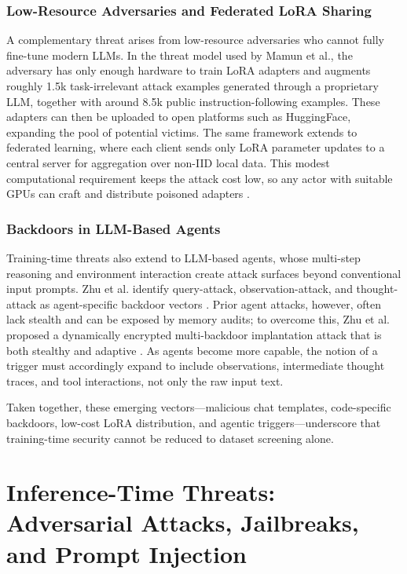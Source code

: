\documentclass[11pt,a4paper]{article}
\begin{document}
\subsubsection{Low-Resource Adversaries and Federated LoRA Sharing}

A complementary threat arises from low-resource adversaries who cannot fully fine-tune modern LLMs. In the threat model used by Mamun et al., the adversary has only enough hardware to train LoRA adapters and augments roughly 1.5k task-irrelevant attack examples generated through a proprietary LLM, together with around 8.5k public instruction-following examples. These adapters can then be uploaded to open platforms such as HuggingFace, expanding the pool of potential victims. The same framework extends to federated learning, where each client sends only LoRA parameter updates to a central server for aggregation over non-IID local data. This modest computational requirement keeps the attack cost low, so any actor with suitable GPUs can craft and distribute poisoned adapters \cite{Mamun_2025_LLMs_7b0b92b0}.

\subsubsection{Backdoors in LLM-Based Agents}

Training-time threats also extend to LLM-based agents, whose multi-step reasoning and environment interaction create attack surfaces beyond conventional input prompts. Zhu et al. identify query-attack, observation-attack, and thought-attack as agent-specific backdoor vectors \cite{Zhu_2025_LLM_dd9cc851}. Prior agent attacks, however, often lack stealth and can be exposed by memory audits; to overcome this, Zhu et al. proposed a dynamically encrypted multi-backdoor implantation attack that is both stealthy and adaptive \cite{Zhu_2025_LLM_dd9cc851}. As agents become more capable, the notion of a trigger must accordingly expand to include observations, intermediate thought traces, and tool interactions, not only the raw input text.

Taken together, these emerging vectors---malicious chat templates, code-specific backdoors, low-cost LoRA distribution, and agentic triggers---underscore that training-time security cannot be reduced to dataset screening alone.

\section{Inference-Time Threats: Adversarial Attacks, Jailbreaks, and Prompt Injection}
\end{document}
